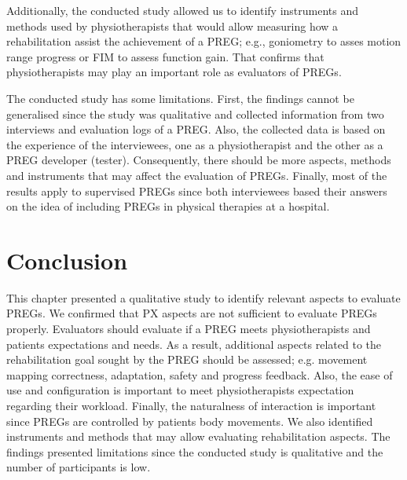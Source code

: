 Additionally, the conducted study allowed us to identify instruments and methods used by physiotherapists that would allow measuring how a rehabilitation assist the achievement of a \ac{PREG}; e.g., goniometry to asses motion range progress or \ac{FIM} to assess function gain. That confirms that physiotherapists may play an important role as evaluators of \acp{PREG}.

The conducted study has some limitations. First, the findings cannot be generalised since the study was qualitative and collected information from two interviews and evaluation logs of a \ac{PREG}. Also, the collected data is based on the experience of the interviewees, one as a physiotherapist and the other as a \ac{PREG} developer (tester). Consequently, there should be more aspects, methods and instruments that may affect the evaluation of \acp{PREG}. Finally, most of the results apply to supervised \acp{PREG} since both interviewees based their answers on the idea of including \acp{PREG} in physical therapies at a hospital.

\section{Conclusion} %
\label{sec:conclusion_aspects}

This chapter presented a qualitative study to identify relevant aspects to evaluate \acp{PREG}. We confirmed that \ac{PX} aspects are not sufficient to evaluate \acp{PREG} properly. Evaluators should evaluate if a \ac{PREG} meets physiotherapists and patients expectations and needs. As a result, additional aspects related to the rehabilitation goal sought by the \ac{PREG} should be assessed; e.g. movement mapping correctness, adaptation, safety and progress feedback. Also, the ease of use and configuration is important to meet physiotherapists expectation regarding their workload. Finally, the naturalness of interaction is important since \acp{PREG} are controlled by patients body movements. We also identified instruments and methods that may allow evaluating rehabilitation aspects. The findings presented limitations since the conducted study is qualitative and the number of participants is low.

